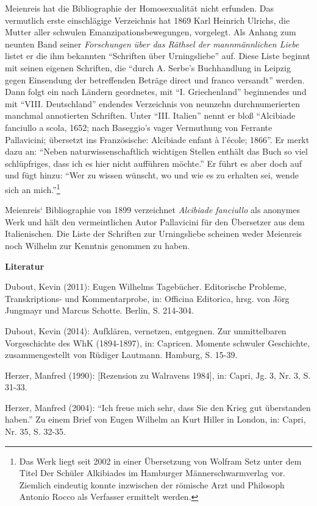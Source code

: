 \documentclass[a4paper,
fontsize=11pt,
oneside,
numbers=noperiodatend,
parskip=half-,
bibliography=totoc,
final
]{scrartcl}
\begin{document}
Meienreis hat die Bibliographie der Homosexualität nicht erfunden. Das
vermutlich erste einschlägige Verzeichnis hat 1869 Karl Heinrich
Ulrichs, die Mutter aller schwulen Emanzipationsbewegungen, vorgelegt.
Als Anhang zum neunten Band seiner \emph{Forschungen über das Räthsel
der mannmännlichen Liebe} listet er die ihm bekannten \enquote{Schriften
über Urningsliebe} auf. Diese Liste beginnt mit seinen eigenen
Schriften, die \enquote{durch A. Serbe's Buchhandlung in Leipzig gegen
Einsendung der betreffenden Beträge direct und franco versandt} werden.
Dann folgt ein nach Ländern geordnetes, mit \enquote{I. Griechenland}
beginnendes und mit \enquote{VIII. Deutschland} endendes Verzeichnis von
neunzehn durchnumerierten manchmal annotierten Schriften. Unter
\enquote{III. Italien} nennt er bloß \enquote{Alcibiade fanciullo a
scola, 1652; nach Baseggio's vager Vermuthung von Ferrante Pallavicini;
übersetzt ins Französische: Alcibiade enfant à l'école; 1866}. Er merkt
dazu an: \enquote{Neben naturwissenschaftlich wichtigen Stellen enthält
das Buch so viel schlüpfriges, dass ich es hier nicht aufführen möchte.}
Er führt es aber doch auf und fügt hinzu: \enquote{Wer zu wissen
wünscht, wo und wie es zu erhalten sei, wende sich an mich.}\footnote{Das
  Werk liegt seit 2002 in einer Übersetzung von Wolfram Setz unter dem
  Titel Der Schüler Alkibiades im Hamburger Männerschwarmverlag vor.
  Ziemlich eindeutig konnte inzwischen der römische Arzt und Philosoph
  Antonio Rocco als Verfasser ermittelt werden.}

Meienreis` Bibliographie von 1899 verzeichnet \emph{Alcibiade fanciullo}
als anonymes Werk und hält den vermeintlichen Autor Pallavicini für den
Übersetzer aus dem Italienischen. Die Liste der Schriften zur
Urningsliebe scheinen weder Meienreis noch Wilhelm zur Kenntnis genommen
zu haben.

\textbf{Literatur}

Dubout, Kevin (2011): Eugen Wilhelms Tagebücher. Editorische Probleme,
Transkriptions- und Kommentarprobe, in: Officina Editorica, hrsg. von
Jörg Jungmayr und Marcus Schotte. Berlin, S. 214-304.

Dubout, Kevin (2014): Aufklären, vernetzen, entgegnen. Zur unmittelbaren
Vorgeschichte des WhK (1894-1897), in: Capricen. Momente schwuler
Geschichte, zusammengestellt von Rüdiger Lautmann. Hamburg, S. 15-39.

Herzer, Manfred (1990): {[}Rezension zu Walravens 1984{]}, in: Capri,
Jg. 3, Nr. 3, S. 31-33.

Herzer, Manfred (2004): \enquote{Ich freue mich sehr, dass Sie den Krieg
gut überstanden haben.} Zu einem Brief von Eugen Wilhelm an Kurt Hiller
in London, in: Capri, Nr. 35, S. 32-35.
\end{document}

